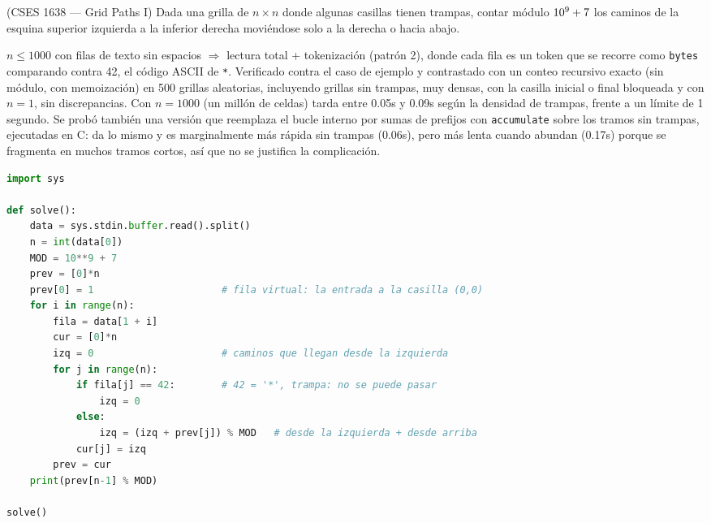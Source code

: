 
(CSES 1638 — Grid Paths I) Dada una grilla de $n \times n$ donde algunas casillas tienen trampas, contar módulo $10^{9}+7$ los caminos de la esquina superior izquierda a la inferior derecha moviéndose solo a la derecha o hacia abajo.

 $n \le 1000$ con filas de texto sin espacios $\Rightarrow$ lectura total + tokenización (patrón 2), donde cada fila es un token que se recorre como \texttt{bytes} comparando contra 42, el código ASCII de \texttt{*}. Verificado contra el caso de ejemplo y contrastado con un conteo recursivo exacto (sin módulo, con memoización) en 500 grillas aleatorias, incluyendo grillas sin trampas, muy densas, con la casilla inicial o final bloqueada y con $n = 1$, sin discrepancias. Con $n = 1000$ (un millón de celdas) tarda entre \aprox{}0.05s y \aprox{}0.09s según la densidad de trampas, frente a un límite de 1 segundo. Se probó también una versión que reemplaza el bucle interno por sumas de prefijos con \texttt{accumulate} sobre los tramos sin trampas, ejecutadas en C: da lo mismo y es marginalmente más rápida sin trampas (\aprox{}0.06s), pero más lenta cuando abundan (\aprox{}0.17s) porque se fragmenta en muchos tramos cortos, así que no se justifica la complicación.


\begin{lstlisting}[language=Python]
import sys

def solve():
    data = sys.stdin.buffer.read().split()
    n = int(data[0])
    MOD = 10**9 + 7
    prev = [0]*n
    prev[0] = 1                      # fila virtual: la entrada a la casilla (0,0)
    for i in range(n):
        fila = data[1 + i]
        cur = [0]*n
        izq = 0                      # caminos que llegan desde la izquierda
        for j in range(n):
            if fila[j] == 42:        # 42 = '*', trampa: no se puede pasar
                izq = 0
            else:
                izq = (izq + prev[j]) % MOD   # desde la izquierda + desde arriba
            cur[j] = izq
        prev = cur
    print(prev[n-1] % MOD)

solve()
\end{lstlisting}

